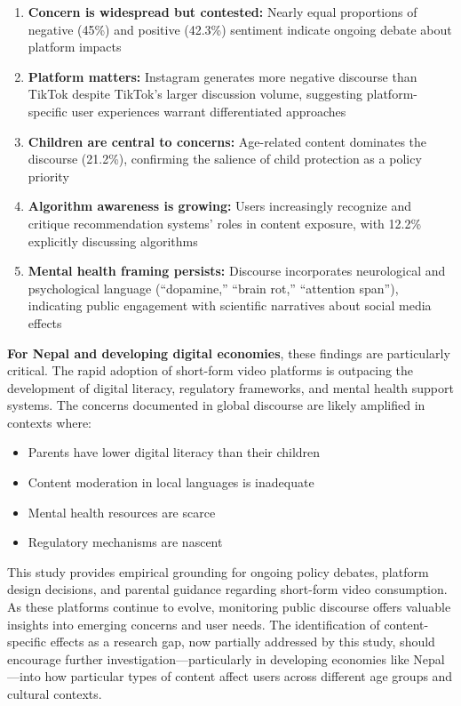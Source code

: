 \documentclass[11pt,a4paper]{article}
\begin{document}
\begin{enumerate}[leftmargin=*, itemsep=0.5em]
    \item \textbf{Concern is widespread but contested:} Nearly equal proportions of negative (45\%) and positive (42.3\%) sentiment indicate ongoing debate about platform impacts

    \item \textbf{Platform matters:} Instagram generates more negative discourse than TikTok despite TikTok's larger discussion volume, suggesting platform-specific user experiences warrant differentiated approaches

    \item \textbf{Children are central to concerns:} Age-related content dominates the discourse (21.2\%), confirming the salience of child protection as a policy priority

    \item \textbf{Algorithm awareness is growing:} Users increasingly recognize and critique recommendation systems' roles in content exposure, with 12.2\% explicitly discussing algorithms

    \item \textbf{Mental health framing persists:} Discourse incorporates neurological and psychological language (``dopamine,'' ``brain rot,'' ``attention span''), indicating public engagement with scientific narratives about social media effects
\end{enumerate}

\textbf{For Nepal and developing digital economies}, these findings are particularly critical. The rapid adoption of short-form video platforms is outpacing the development of digital literacy, regulatory frameworks, and mental health support systems. The concerns documented in global discourse are likely amplified in contexts where:
\begin{itemize}[itemsep=0.2em]
    \item Parents have lower digital literacy than their children
    \item Content moderation in local languages is inadequate
    \item Mental health resources are scarce
    \item Regulatory mechanisms are nascent
\end{itemize}

This study provides empirical grounding for ongoing policy debates, platform design decisions, and parental guidance regarding short-form video consumption. As these platforms continue to evolve, monitoring public discourse offers valuable insights into emerging concerns and user needs. The identification of content-specific effects as a research gap, now partially addressed by this study, should encourage further investigation---particularly in developing economies like Nepal---into how particular types of content affect users across different age groups and cultural contexts.
\end{document}
